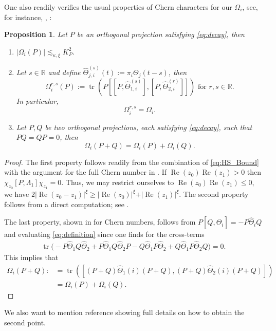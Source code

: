 \documentclass[reqno,12pt,letterpaper]{amsart}
\newcommand{\RR}{{\mathbb R}}
\newtheorem{prop}[theo]{Proposition}
\numberwithin{equation}{section}
\DeclareMathOperator{\Real}{Re}
\let\Re=\Real
\DeclareMathOperator{\tr}{tr}
\begin{document}
\begin{appendix}
One also readily verifies the usual properties of Chern characters for our $\Omega_i$, see, for instance, \cite[Lemma 3.1]{GKS}, \cite{BES94}:
\begin{prop}
\label{prop:auxiliary}
Let $P$ be an orthogonal projection satisfying \eqref{eq:decay}, then 
\begin{enumerate}
\item  $\vert \Omega_i(P)\vert \lesssim_{\kappa,\xi} K_P^2.$
\item Let $s \in \mathbb R$ and define $\hat \Theta^{(s)}_{j,i}(t) :=\pi_i  \Theta_j(t-s) $, then 
\[ \Omega_i^{r,s}(P):=\tr(P[[P,\hat \Theta_{1,i}^{(s)}],[P,\hat \Theta_{2,i}^{(r)}]]) \text{ for }r,s \in \RR.\]
In particular, 
\begin{equation}
\label{eq:covariance_rel}
\Omega_i^{r,s} = \Omega_i.
\end{equation}
\item Let $P,Q$ be two orthogonal projections, each satisfying \eqref{eq:decay}, such that $PQ = QP = 0$, then \[ \Omega_i(P+Q) = \Omega_i(P)+\Omega_i(Q).\]
\end{enumerate}
\end{prop}
\begin{proof}
The first property follows readily from the combination of \eqref{eq:HS_Bound} with the argument for the full Chern number in \cite[Lemma 3.1 (i)]{GKS}. 
If $\Re(z_0)\Re(z_1)>0$ then $\chi_{z_0} [P,\Lambda_1]\chi_{z_1}=0$. Thus, we may restrict ourselves to $\Re(z_0)\Re(z_1)\le 0$, we have $2\vert \Re(z_0-z_1)\vert^{\xi} \ge \vert \Re(z_0)\vert^{\xi} + \vert \Re(z_1)\vert^{\xi}. $
The second property follows from a direct computation; see \cite[Lemma 3.1 (ii)]{GKS}. 

The last property, shown in \cite[Lemma $8$]{BES94} for Chern numbers, follows from $P[Q, \hat \Theta_i] = -P\hat \Theta_i Q$ and evaluating \eqref{eq:definition} since one finds for the cross-terms 
\[ \begin{split} 
 \tr\Big(-P \hat \Theta_1 Q\hat \Theta_2 +P \hat \Theta_1 Q \hat \Theta_2 P -Q \hat \Theta_1 P \hat \Theta_2 + Q \hat \Theta_1 P \hat \Theta_2 Q  \Big)=0.
 \end{split}\]
This implies that
\[\begin{split} \Omega_i(P+Q):&=\tr( [(P+Q)\hat \Theta_1(i) (P+Q) , (P+Q) \hat \Theta_2(i) (P+Q)])  \\
&=\Omega_i(P)+ \Omega_i(Q).
\end{split} \]
\end{proof}
We also want to mention reference \cite[Sec.6]{ASS} showing full details on how to obtain the second point.


\end{appendix}
\end{document}
